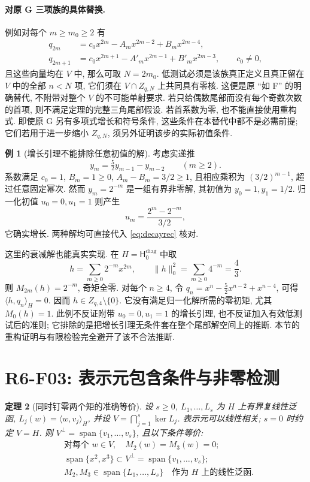 \documentclass[UTF8,11pt]{ctexart}
\newtheorem{theorem}{定理}[section]
\theoremstyle{definition}
\newtheorem{example}[theorem]{例}
\DeclareMathOperator{\Span}{span}
\newcommand{\ip}[2]{\langle #1,#2\rangle_H}
\newcommand{\Hd}[1]{\mathsf H_{#1}^{\mathrm{diag}}}
\begin{document}
\paragraph{对原 G 三项族的具体替换.}
例如对每个 $m\geq m_0\geq2$ 有
\[
 \begin{aligned}
 q_{2m}&=c_0x^{2m}-A_mx^{2m-2}+B_mx^{2m-4},\\
 q_{2m+1}&=c_0x^{2m+1}-A'_mx^{2m-1}+B'_mx^{2m-3},\qquad c_0\ne0,
 \end{aligned}
\]
且这些向量均在 $V$ 中, 那么可取 $N=2m_0$.
低测试必须是该族真正定义且真正留在 $V$ 中的全部 $n<N$ 项,
它们须在 $V\cap Z_{q,N}$ 上共同具有零核.
这便是原 ``如 F'' 的明确替代, 不附带对整个 $V$ 的不可能单射要求.
若只给偶数尾部而没有每个奇数次数的首项, 则不满足定理的完整三角尾部假设.
若首系数为零, 也不能直接使用重构式.
即使原 G 另有多项式增长和符号条件, 这些条件在本替代中都不是必需前提;
它们若用于进一步缩小 $Z_{q,N}$, 须另外证明该步的实际初值条件.

\begin{example}[增长引理不能排除任意初值的解]\label{ex:growth}
考虑实递推
\begin{equation}\label{eq:decayrec}
 y_m=\tfrac52 y_{m-1}-y_{m-2}\qquad(m\geq2).
\end{equation}
系数满足 $c_0=1$, $B_m=1\geq0$, $A_m-B_m=3/2\geq1$,
且相应乘积为 $(3/2)^{m-1}$, 超过任意固定幂次.
然而 $y_m=2^{-m}$ 是一组有界非零解, 其初值为 $y_0=1,y_1=1/2$.
归一化初值 $u_0=0,u_1=1$ 则产生
\[
 u_m=\frac{2^m-2^{-m}}{3/2},
\]
它确实增长. 两种解均可直接代入 \eqref{eq:decayrec} 核对.

这里的衰减解也能真实实现. 在 $H=\Hd0$ 中取
\[
 h=\sum_{m\geq0}2^{-m}x^{2m},\qquad \|h\|_0^2=\sum_{m\geq0}4^{-m}=\frac43.
\]
则 $M_{2m}(h)=2^{-m}$, 奇矩全零.
对每个 $n\geq4$, 令 $q_n=x^n-\tfrac52x^{n-2}+x^{n-4}$,
可得 $\ip{h}{q_n}=0$. 因而 $h\in Z_{q,4}\setminus\{0\}$.
它没有满足归一化解所需的零初矩, 尤其 $M_0(h)=1$.
此例不反证附带 $u_0=0,u_1=1$ 的增长引理, 也不反证加入有效低测试后的准则;
它排除的是把增长引理无条件套在整个尾部解空间上的推断.
本节的重构证明与有限检验完全避开了该不合法推断.
\end{example}

\section{R6-F03: 表示元包含条件与非零检测}\label{sec:representer}

\begin{theorem}[同时钉零两个矩的准确等价]\label{thm:representer}
设 $s\geq0$, $L_1,\ldots,L_s$ 为 $H$ 上有界复线性泛函,
$L_j(w)=\ip{w}{v_j}$, 并设 $V=\bigcap_{j=1}^s\ker L_j$.
表示元可以线性相关; $s=0$ 时约定 $V=H$.
则 $V^\perp=\Span\{v_1,\ldots,v_s\}$, 且以下条件等价:
\begin{align}
 &\text{对每个 }w\in V,\quad M_2(w)=M_3(w)=0;\label{eq:pinned}\\
 &\Span\{x^2,x^3\}\subset V^\perp=\Span\{v_1,\ldots,v_s\};\label{eq:inclusion}\\
 &M_2,M_3\in\Span\{L_1,\ldots,L_s\}\quad\text{作为 }H\text{ 上的线性泛函}.
 \label{eq:functionalspan}
\end{align}
\end{theorem}
\end{document}
